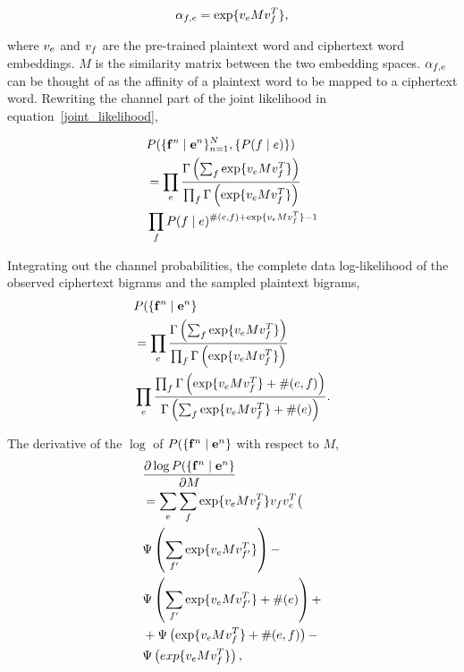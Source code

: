 \begin{equation}
\alpha_{f,e} = \exp \{ v_{e}  M  v_{f}^T \},
\end{equation}

where $v_{e}$ and $v_{f}$ are the pre-trained plaintext word and ciphertext word embeddings.  $M$ is the similarity matrix between the two embedding spaces. $\alpha_{f,e}$ can be thought of as the affinity of a plaintext word to be mapped to a ciphertext word. Rewriting the channel part of the joint likelihood in equation~\ref{joint_likelihood}, 

\begin{align*}
&P( \{ \mathbf{f}^n \mid \mathbf{e}^n \}_{n=1}^{N}, \{ P(f \mid e) \})  \\
&=\prod_{e}  \frac{\Gamma \left( \sum_{f} \exp \{ v_{e}  M  v_{f}^T \}  \right)} {\prod_{f} \Gamma \left( \exp \{ v_{e}  M  v_{f}^T \} \right)} \\
& \prod_{f} P(f \mid e)^{\#(e,f)+ \exp \{ v_{e}  M  v_{f}^T \} -1} 
\end{align*}

Integrating out the channel probabilities, the complete data log-likelihood of the observed ciphertext bigrams and the sampled plaintext bigrams,
\begin{align*}
&P( \{ \mathbf{f}^n \mid \mathbf{e}^n \} \\
&= \prod_{e}  \frac{\Gamma \left( \sum_{f} \exp \{ v_{e}  M  v_{f}^T \}  \right)} {\prod_{f} \Gamma \left( \exp \{ v_{e}  M  v_{f}^T \} \right)} \\
& \prod_{e}  \frac{\prod_{f} \Gamma \left( \exp \{ v_{e}  M  v_{f}^T \} + \#(e,f) \right)} {\Gamma \left( \sum_{f} \exp \{ v_{e}  M  v_{f}^T \} + \#(e) \right)}.
\end{align*}

The derivative of the $\log$ of $P( \{ \mathbf{f}^n \mid \mathbf{e}^n \}$ with respect to $M$, 
\begin{align*}
&\frac {\partial \log P( \{ \mathbf{f}^n \mid \mathbf{e}^n \}}{\partial M}  \\
& = \sum_{e}  \sum_{f} \exp \{ v_{e}  M  v_{f}^T \}  v_{f} v_{e}^T \bigl( \\
& \Psi \left( \sum_{f'} \exp \{ v_{e}  M  v_{f'}^T \} \right) - \\
& \Psi \left( \sum_{f'} \exp \{ v_{e}  M  v_{f'}^T \} + \#(e) \right)  + \\
& + \Psi \left( \exp \{ v_{e}  M  v_{f}^T \} + \#(e,f) \right) - \\
& \Psi \left( exp \{ v_{e}  M  v_{f}^T \} \right), 
\end{align*}

